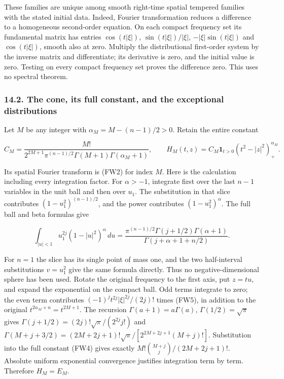 \documentclass[
  11pt,
]{article}
\begin{document}
These families are unique among smooth right-time spatial tempered
families with the stated initial data. Indeed, Fourier transformation
reduces a difference to a homogeneous second-order equation. On each
compact frequency set its fundamental matrix has entries
\(\cos(t|\xi|)\), \(\sin(t|\xi|)/|\xi|\), \(-|\xi|\sin(t|\xi|)\) and
\(\cos(t|\xi|)\), smooth also at zero. Multiply the distributional
first-order system by the inverse matrix and differentiate; its
derivative is zero, and the initial value is zero. Testing on every
compact frequency set proves the difference zero. This uses no spectral
theorem.

\subsubsection{14.2. The cone, its full constant, and the exceptional
distributions}\label{the-cone-its-full-constant-and-the-exceptional-distributions}

Let \(M\) be any integer with \(\alpha_M=M-(n-1)/2>0\). Retain the
entire constant

\[
 C_M=\frac{M!}{2^{2M+1}\pi^{(n-1)/2}
                 \Gamma(M+1)\Gamma(\alpha_M+1)},\qquad
 H_M(t,z)=C_M\boldsymbol1_{t>0}(t^2-|z|^2)_+^{\alpha_M}.
 \tag{FW4}
\]

Its spatial Fourier transform is (FW2) for index \(M\). Here is the
calculation including every integration factor. For \(\alpha>-1\),
integrate first over the last \(n-1\) variables in the unit ball and
then over \(u_1\). The substitution in that slice contributes
\((1-u_1^2)^{(n-1)/2}\), and the power contributes \((1-u_1^2)^\alpha\).
The full ball and beta formulas give

\[
 \int_{|u|<1}u_1^{2j}(1-|u|^2)^\alpha\,du
 =\frac{\pi^{(n-1)/2}\Gamma(j+1/2)\Gamma(\alpha+1)}
              {\Gamma(j+\alpha+1+n/2)} .\tag{FW5}
\]

For \(n=1\) the slice has its single point of mass one, and the two
half-interval substitutions \(v=u_1^2\) give the same formula directly.
Thus no negative-dimensional sphere has been used. Rotate the original
frequency to the first axis, put \(z=tu\), and expand the exponential on
the compact ball. Odd terms integrate to zero; the even term contributes
\((-1)^j t^{2j}|\xi|^{2j}/(2j)!\) times (FW5), in addition to the
original \(t^{2\alpha_M+n}=t^{2M+1}\). The recursion
\(\Gamma(a+1)=a\Gamma(a)\), \(\Gamma(1/2)=\sqrt\pi\) gives
\(\Gamma(j+1/2)=(2j)!\sqrt\pi/(2^{2j}j!)\) and
\(\Gamma(M+j+3/2)=(2M+2j+1)!\sqrt\pi/[2^{2M+2j+1}(M+j)!]\). Substitution
into the full constant (FW4) gives exactly
\(M!\binom{M+j}{j}/(2M+2j+1)!\). Absolute uniform exponential
convergence justifies integration term by term. Therefore \(H_M=E_M\).
\end{document}
